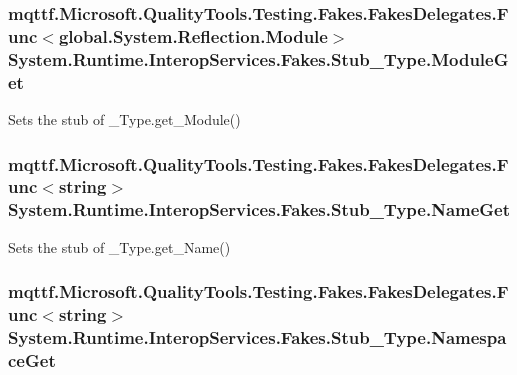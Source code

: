 \hypertarget{class_system_1_1_runtime_1_1_interop_services_1_1_fakes_1_1_stub___type_a64c770ace80d8ca45680adadc59b3352}{
\subsubsection[{Module\-Get}]{\setlength{\rightskip}{0pt plus 5cm}mqttf.\-Microsoft.\-Quality\-Tools.\-Testing.\-Fakes.\-Fakes\-Delegates.\-Func$<$global.\-System.\-Reflection.\-Module$>$ System.\-Runtime.\-Interop\-Services.\-Fakes.\-Stub\-\_\-\-Type.\-Module\-Get}}\label{class_system_1_1_runtime_1_1_interop_services_1_1_fakes_1_1_stub___type_a64c770ace80d8ca45680adadc59b3352}


Sets the stub of \-\_\-\-Type.\-get\-\_\-\-Module()

\hypertarget{class_system_1_1_runtime_1_1_interop_services_1_1_fakes_1_1_stub___type_a8613753324eadff5d550fad74e53f328}{
\subsubsection[{Name\-Get}]{\setlength{\rightskip}{0pt plus 5cm}mqttf.\-Microsoft.\-Quality\-Tools.\-Testing.\-Fakes.\-Fakes\-Delegates.\-Func$<$string$>$ System.\-Runtime.\-Interop\-Services.\-Fakes.\-Stub\-\_\-\-Type.\-Name\-Get}}\label{class_system_1_1_runtime_1_1_interop_services_1_1_fakes_1_1_stub___type_a8613753324eadff5d550fad74e53f328}


Sets the stub of \-\_\-\-Type.\-get\-\_\-\-Name()

\hypertarget{class_system_1_1_runtime_1_1_interop_services_1_1_fakes_1_1_stub___type_aa1fb62536670fe8353faf4f0e40df1bf}{
\subsubsection[{Namespace\-Get}]{\setlength{\rightskip}{0pt plus 5cm}mqttf.\-Microsoft.\-Quality\-Tools.\-Testing.\-Fakes.\-Fakes\-Delegates.\-Func$<$string$>$ System.\-Runtime.\-Interop\-Services.\-Fakes.\-Stub\-\_\-\-Type.\-Namespace\-Get}}\label{class_system_1_1_runtime_1_1_interop_services_1_1_fakes_1_1_stub___type_aa1fb62536670fe8353faf4f0e40df1bf}


